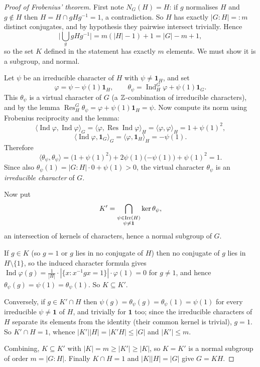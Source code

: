 \documentclass[a4paper]{scrartcl}
\newcommand{\Ind}{\operatorname{Ind}}
\newcommand{\Res}{\operatorname{Res}}
\newcommand{\Irr}{\operatorname{Irr}}
\newcommand{\ip}[2]{\langle #1, #2 \rangle}
\begin{document}
\begin{proof}[Proof of Frobenius' theorem]
	First note $N_G(H) = H$: if $g$ normalises $H$ and $g\notin H$ then $H = H\cap gHg^{-1} = 1$, a contradiction. So $H$ has exactly $|G:H| =: m$ distinct conjugates, and by hypothesis they pairwise intersect trivially. Hence
	$$\Big|\bigcup_g gHg^{-1}\Big| = m(|H|-1) + 1 = |G| - m + 1,$$
	so the set $K$ defined in the statement has exactly $m$ elements. We must show it is a subgroup, and normal.

	Let $\psi$ be an irreducible character of $H$ with $\psi\neq\mathbf 1_H$, and set
	$$\varphi = \psi - \psi(1)\mathbf 1_H, \qquad \theta_\psi = \Ind_H^G\varphi + \psi(1)\mathbf 1_G.$$
	This $\theta_\psi$ is a virtual character of $G$ (a $\mathbb{Z}$-combination of irreducible characters), and by the lemma $\Res^G_H\theta_\psi = \varphi + \psi(1)\mathbf 1_H = \psi$. Now compute its norm using Frobenius reciprocity and the lemma:
	$$\ip{\Ind\varphi}{\Ind\varphi}_G = \ip{\varphi}{\Res\Ind\varphi}_H = \ip\varphi\varphi_H = 1 + \psi(1)^2,$$
	$$\ip{\Ind\varphi}{\mathbf 1_G}_G = \ip{\varphi}{\mathbf 1_H}_H = -\psi(1).$$
	Therefore
	$$\ip{\theta_\psi}{\theta_\psi} = \big(1+\psi(1)^2\big) + 2\psi(1)\big({-\psi(1)}\big) + \psi(1)^2 = 1.$$
	Since also $\theta_\psi(1) = |G:H|\cdot 0 + \psi(1) > 0$, the virtual character $\theta_\psi$ is an \emph{irreducible character} of $G$.

	Now put
	$$K' = \bigcap_{\substack{\psi\in\Irr(H)\\ \psi\neq\mathbf1}}\kernel\theta_\psi,$$
	an intersection of kernels of characters, hence a normal subgroup of $G$.

	If $g \in K$ (so $g = 1$ or $g$ lies in no conjugate of $H$) then no conjugate of $g$ lies in $H\setminus\{1\}$, so the induced character formula gives $\Ind\varphi(g) = \frac{1}{|H|}\cdot|\{x : x^{-1}gx = 1\}|\cdot\varphi(1) = 0$ for $g\neq 1$, and hence $\theta_\psi(g) = \psi(1) = \theta_\psi(1)$. So $K\subseteq K'$.

	Conversely, if $g \in K'\cap H$ then $\psi(g) = \theta_\psi(g) = \theta_\psi(1) = \psi(1)$ for every irreducible $\psi\neq\mathbf1$ of $H$, and trivially for $\mathbf 1$ too; since the irreducible characters of $H$ separate its elements from the identity (their common kernel is trivial), $g = 1$. So $K'\cap H = 1$, whence $|K'||H| = |K'H|\leq|G|$ and $|K'|\leq m$.

	Combining, $K\subseteq K'$ with $|K| = m \geq |K'| \geq |K|$, so $K = K'$ is a normal subgroup of order $m = |G:H|$. Finally $K\cap H = 1$ and $|K||H| = |G|$ give $G = KH$.
\end{proof}
\end{document}
